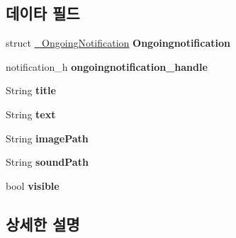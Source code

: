 \subsection*{데이타 필드}
\begin{DoxyCompactItemize}
\item 
\hypertarget{struct___ongoing_notification_extend_ae6e96ac9bd41838e84b87ca988c9bf29}{struct \hyperlink{struct___ongoing_notification}{\-\_\-\-Ongoing\-Notification} {\bfseries Ongoingnotification}}\label{struct___ongoing_notification_extend_ae6e96ac9bd41838e84b87ca988c9bf29}

\item 
\hypertarget{struct___ongoing_notification_extend_a51c003647fa5a319570219a88a5672ec}{notification\-\_\-h {\bfseries ongoingnotification\-\_\-handle}}\label{struct___ongoing_notification_extend_a51c003647fa5a319570219a88a5672ec}

\item 
\hypertarget{struct___ongoing_notification_extend_a499aeec850a240ae1aecd939c5043590}{String {\bfseries title}}\label{struct___ongoing_notification_extend_a499aeec850a240ae1aecd939c5043590}

\item 
\hypertarget{struct___ongoing_notification_extend_a685ed5195435d2b3e75433f46aec6e1e}{String {\bfseries text}}\label{struct___ongoing_notification_extend_a685ed5195435d2b3e75433f46aec6e1e}

\item 
\hypertarget{struct___ongoing_notification_extend_a7480fd65ec0c3010b75b111ed2611adb}{String {\bfseries image\-Path}}\label{struct___ongoing_notification_extend_a7480fd65ec0c3010b75b111ed2611adb}

\item 
\hypertarget{struct___ongoing_notification_extend_ac2d6721b778cd06197fc40a5595c54e1}{String {\bfseries sound\-Path}}\label{struct___ongoing_notification_extend_ac2d6721b778cd06197fc40a5595c54e1}

\item 
\hypertarget{struct___ongoing_notification_extend_aa54a57ae048476d840caf6d4d2c47aa3}{bool {\bfseries visible}}\label{struct___ongoing_notification_extend_aa54a57ae048476d840caf6d4d2c47aa3}

\end{DoxyCompactItemize}


\subsection{상세한 설명}


